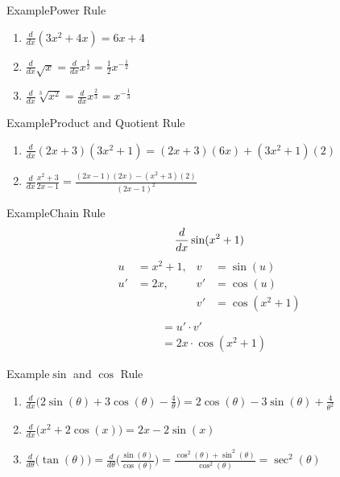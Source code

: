 \documentclass{MathNotes}
\newenvironment{example}[1]{\begin{BlueBox}{Example}{#1}}{\end{BlueBox}}
\begin{document}
\begin{example}{Power Rule}
	\begin{multicols}{2}
		\begin{enumerate}
			\item $\displaystyle\frac{d}{dx}(3x^2+4x)=6x+4$
			\item $\displaystyle\frac{d}{dx}\sqrt{x}=\frac{d}{dx}x^{\frac{1}{2}}
				      =\frac{1}{2}x^{-\frac{1}{2}}$
			\item $\displaystyle\frac{d}{dx}\sqrt[3]{x^2}=\frac{d}{dx}x^{\frac{2}{3}}
				      =x^{-\frac{1}{3}}$
		\end{enumerate}
	\end{multicols}
\end{example}

\begin{example}{Product and Quotient Rule}
	\begin{enumerate}
		\item $\displaystyle\frac{d}{dx}(2x+3)(3x^2+1)=(2x+3)(6x)+(3x^2+1)(2)$
		\item $\displaystyle\frac{d}{dx}\frac{x^2+3}{2x-1}
			      =\frac{(2x-1)(2x)-(x^2+3)(2)}{(2x-1)^2}$
	\end{enumerate}
\end{example}

\newpage
{}
\begin{example}{Chain Rule}
	$$
		\frac{d}{dx}\sin(x^2+1) \\
	$$
	\begin{align*}
		u  & =x^2+1, & v  & =\sin(u)     \\
		u' & =2x,    & v' & =\cos(u)     \\
		   &         & v' & =\cos(x^2+1) \\
	\end{align*}
	\begin{align*}
		 & =u'\cdot v'         \\
		 & =2x\cdot\cos(x^2+1)
	\end{align*}
\end{example}
\begin{example}{$\sin$ and $\cos$ Rule}
	\begin{enumerate}
		\item $\displaystyle\frac{d}{dx}
			      \bigl(2\sin(\theta)+3\cos(\theta)-\frac{4}{\theta}\bigr)=
			      2\cos(\theta)-3\sin(\theta)+\frac{4}{\theta^2}
		      $
		\item $\displaystyle\frac{d}{dx}\bigl(x^2+2\cos(x)\bigr)=2x-2\sin(x)$
		\item $\displaystyle\frac{d}{d\theta}\bigl(\tan(\theta)\bigr)
			      =\frac{d}{d\theta}\bigl(\frac{\sin(\theta)}{\cos(\theta)}\bigr)
			      =\frac{\cos^2(\theta)+\sin^2(\theta)}{\cos^2(\theta)}
			      =\sec^2(\theta)$
	\end{enumerate}
\end{example}
\end{document}
